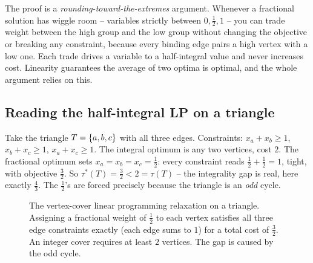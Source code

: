 \begin{whybox}
The proof is a \emph{rounding-toward-the-extremes} argument. Whenever a
fractional solution has wiggle room -- variables strictly between
$0,\tfrac12,1$ -- you can trade weight between the high group and the low group
without changing the objective or breaking any constraint, because every binding
edge pairs a high vertex with a low one. Each trade drives a variable to a
half-integral value and never increases cost. Linearity guarantees the average of
two optima is optimal, and the whole argument relies on this.
\end{whybox}

\subsection{Reading the half-integral LP on a triangle}

Take the triangle $T=\{a,b,c\}$ with all three edges. Constraints:
$x_a+x_b\ge1$, $x_b+x_c\ge1$, $x_a+x_c\ge1$. The integral optimum is any two
vertices, cost $2$. The fractional optimum sets $x_a=x_b=x_c=\tfrac12$: every
constraint reads $\tfrac12+\tfrac12=1$, tight, with objective $\tfrac32$. So
$\tau^*(T)=\tfrac32<2=\tau(T)$ -- the integrality gap is real, here exactly
$\tfrac43$. The $\tfrac12$'s are forced precisely because the triangle is an
\emph{odd} cycle.

\begin{figure}[htbp]
\centering
{}
\caption{The vertex-cover linear programming relaxation on a triangle. Assigning a fractional weight of $\tfrac12$ to each vertex satisfies all three edge constraints exactly (each edge sums to $1$) for a total cost of $\tfrac32$. An integer cover requires at least $2$ vertices. The gap is caused by the odd cycle.}
\label{ch29:fig-lp-triangle}
\end{figure}

